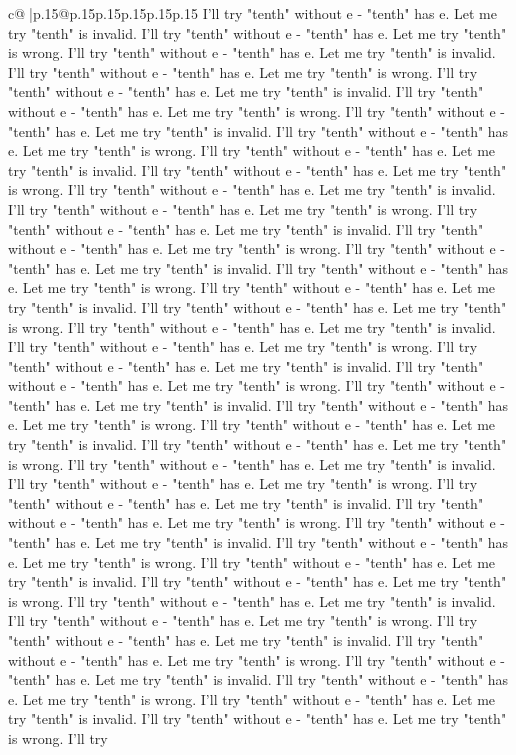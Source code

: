 \documentclass{article}
\begin{document}
{\begin{supertabular}{c@{$\;$}|p{.15\linewidth}@{}p{.15\linewidth}p{.15\linewidth}p{.15\linewidth}p{.15\linewidth}p{.15\linewidth}}
{{{I'll try "tenth" without e {-} "tenth" has e. Let me try "tenth" is invalid. I'll try "tenth" without e {-} "tenth" has e. Let me try "tenth" is wrong. I'll try "tenth" without e {-} "tenth" has e. Let me try "tenth" is invalid. I'll try "tenth" without e {-} "tenth" has e. Let me try "tenth" is wrong. I'll try "tenth" without e {-} "tenth" has e. Let me try "tenth" is invalid. I'll try "tenth" without e {-} "tenth" has e. Let me try "tenth" is wrong. I'll try "tenth" without e {-} "tenth" has e. Let me try "tenth" is invalid. I'll try "tenth" without e {-} "tenth" has e. Let me try "tenth" is wrong. I'll try "tenth" without e {-} "tenth" has e. Let me try "tenth" is invalid. I'll try "tenth" without e {-} "tenth" has e. Let me try "tenth" is wrong. I'll try "tenth" without e {-} "tenth" has e. Let me try "tenth" is invalid. I'll try "tenth" without e {-} "tenth" has e. Let me try "tenth" is wrong. I'll try "tenth" without e {-} "tenth" has e. Let me try "tenth" is invalid. I'll try "tenth" without e {-} "tenth" has e. Let me try "tenth" is wrong. I'll try "tenth" without e {-} "tenth" has e. Let me try "tenth" is invalid. I'll try "tenth" without e {-} "tenth" has e. Let me try "tenth" is wrong. I'll try "tenth" without e {-} "tenth" has e. Let me try "tenth" is invalid. I'll try "tenth" without e {-} "tenth" has e. Let me try "tenth" is wrong. I'll try "tenth" without e {-} "tenth" has e. Let me try "tenth" is invalid. I'll try "tenth" without e {-} "tenth" has e. Let me try "tenth" is wrong. I'll try "tenth" without e {-} "tenth" has e. Let me try "tenth" is invalid. I'll try "tenth" without e {-} "tenth" has e. Let me try "tenth" is wrong. I'll try "tenth" without e {-} "tenth" has e. Let me try "tenth" is invalid. I'll try "tenth" without e {-} "tenth" has e. Let me try "tenth" is wrong. I'll try "tenth" without e {-} "tenth" has e. Let me try "tenth" is invalid. I'll try "tenth" without e {-} "tenth" has e. Let me try "tenth" is wrong. I'll try "tenth" without e {-} "tenth" has e. Let me try "tenth" is invalid. I'll try "tenth" without e {-} "tenth" has e. Let me try "tenth" is wrong. I'll try "tenth" without e {-} "tenth" has e. Let me try "tenth" is invalid. I'll try "tenth" without e {-} "tenth" has e. Let me try "tenth" is wrong. I'll try "tenth" without e {-} "tenth" has e. Let me try "tenth" is invalid. I'll try "tenth" without e {-} "tenth" has e. Let me try "tenth" is wrong. I'll try "tenth" without e {-} "tenth" has e. Let me try "tenth" is invalid. I'll try "tenth" without e {-} "tenth" has e. Let me try "tenth" is wrong. I'll try "tenth" without e {-} "tenth" has e. Let me try "tenth" is invalid. I'll try "tenth" without e {-} "tenth" has e. Let me try "tenth" is wrong. I'll try "tenth" without e {-} "tenth" has e. Let me try "tenth" is invalid. I'll try "tenth" without e {-} "tenth" has e. Let me try "tenth" is wrong. I'll try "tenth" without e {-} "tenth" has e. Let me try "tenth" is invalid. I'll try "tenth" without e {-} "tenth" has e. Let me try "tenth" is wrong. I'll try "tenth" without e {-} "tenth" has e. Let me try "tenth" is invalid. I'll try "tenth" without e {-} "tenth" has e. Let me try "tenth" is wrong. I'll try }}}
\end{supertabular}}
\end{document}
